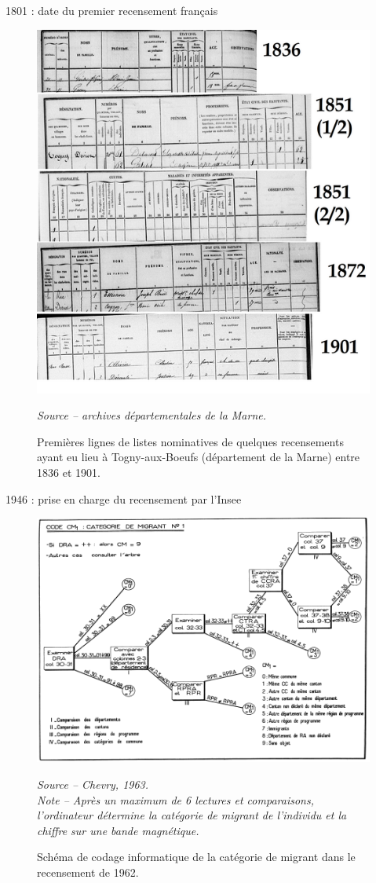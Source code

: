 \documentclass[10pt,xcolor=table,color={dvipsnames,usenames},ignorenonframetext,usepdftitle=false,french]{beamer}
\begin{document}
\begin{frame}{1801 : date du premier recensement français}
\protect\hypertarget{date-du-premier-recensement-franuxe7ais}{}
\bigskip

\begin{figure}
  \caption{Premières lignes de listes nominatives de quelques recensements ayant eu lieu à Togny-aux-Boeufs (département de la Marne) entre 1836 et 1901.}
\begin{center}
\includegraphics[width = 0.5\linewidth]{img/support1.png}
\end{center}
\footnotesize
\emph{Source -- archives départementales de la Marne.}
\end{figure}
\end{frame}

\begin{frame}{1946 : prise en charge du recensement par l'Insee}
\protect\hypertarget{prise-en-charge-du-recensement-par-linsee}{}
\medskip

\begin{figure}
  \caption{Schéma de codage informatique de la catégorie de migrant dans le recensement de 1962.}
\begin{center}
\includegraphics[width = 0.6\linewidth]{img/informatique.png}
\end{center}
\footnotesize
\emph{Source -- Chevry, 1963.\\Note -- Après un maximum de 6 lectures et comparaisons, l’ordinateur détermine la catégorie de migrant de l’individu et la chiffre sur une bande magnétique.}
\end{figure}
\end{frame}
\end{document}
